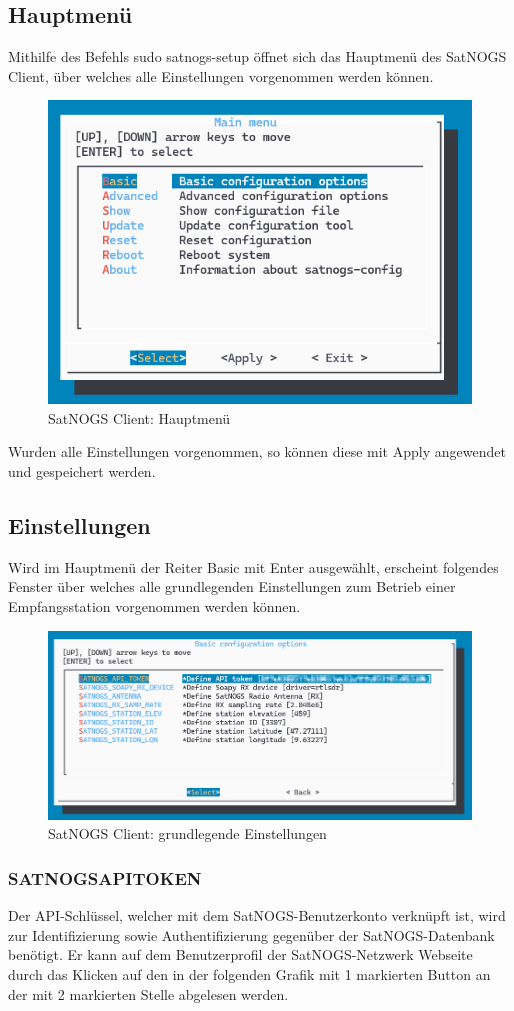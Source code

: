 \subsection{Hauptmenü}
Mithilfe des Befehls \glqq sudo satnogs-setup\grqq{} öffnet sich das Hauptmenü des SatNOGS Client, über welches alle Einstellungen vorgenommen werden können.

\begin{figure} [H]
	\centering
	\includegraphics[width=.5\linewidth]{../ref/mainmenu.png}
	\caption{SatNOGS Client: Hauptmenü}
	\label{fig:mainmenu}
\end{figure}

Wurden alle Einstellungen vorgenommen, so können diese mit \glqq Apply\grqq{} angewendet und gespeichert werden.

\subsection{Einstellungen}
Wird im Hauptmenü der Reiter \glqq Basic\grqq{} mit \glqq Enter\grqq{} ausgewählt, erscheint folgendes Fenster über welches alle grundlegenden Einstellungen zum Betrieb einer Empfangsstation vorgenommen werden können.

\begin{figure} [H]
	\centering
	\includegraphics[width=.75\linewidth]{../ref/basic_configurations.png}
	\caption{SatNOGS Client: grundlegende Einstellungen}
	\label{fig:basic_configurations}
\end{figure}

\subsubsection{SATNOGS\textunderscore API\textunderscore TOKEN}
Der API-Schlüssel, welcher mit dem SatNOGS-Benutzerkonto verknüpft ist, wird zur Identifizierung sowie Authentifizierung gegenüber der SatNOGS-Datenbank benötigt. Er kann auf dem Benutzerprofil der SatNOGS-Netzwerk Webseite durch das Klicken auf den in der folgenden Grafik mit 1 markierten Button an der mit 2 markierten Stelle abgelesen werden.

